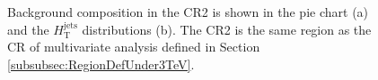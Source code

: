 \begin{figure}[H]
  \centering
  \caption{Background composition in the CR2 is shown in the pie chart (a) and the $H_{\text{T}}^{\text{jets}}$ distributions (b). The CR2 is the same region as the CR of multivariate analysis defined in Section \ref{subsubsec:RegionDefUnder3TeV}.}
  \label{fig:BkgComposition_CR2_CC}
\end{figure}

